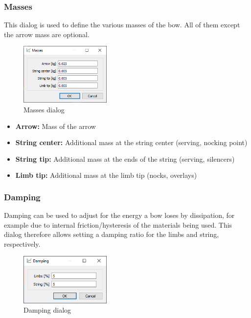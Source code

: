 \documentclass[12pt]{article}
\begin{document}
\newpage
\subsubsection{Masses}

This dialog is used to define the various masses of the bow. All of them except the arrow mass are optional.

\begin{figure}[H]
\centering
\includegraphics[width=0.4\textwidth]{figures/screenshots/input/masses}
\caption{Masses dialog}
\label{fig:masses}
\end{figure}

\begin{itemize}
\item \textbf{Arrow:} Mass of the arrow
\item \textbf{String center:} Additional mass at the string center (serving, nocking point)
\item \textbf{String tip:} Additional mass at the ends of the string (serving, silencers)
\item \textbf{Limb tip:} Additional mass at the limb tip (nocks, overlays)
\end{itemize}

\newpage
\subsubsection{Damping}

Damping can be used to adjust for the energy a bow loses by dissipation, for example due to internal friction/hysteresis of the materials being used.
This dialog therefore allows setting a damping ratio for the limbs and string, respectively.

\begin{figure}[H]
\centering
\includegraphics[width=0.4\textwidth]{figures/screenshots/input/damping}
\caption{Damping dialog}
\label{fig:damping}
\end{figure}
\end{document}
